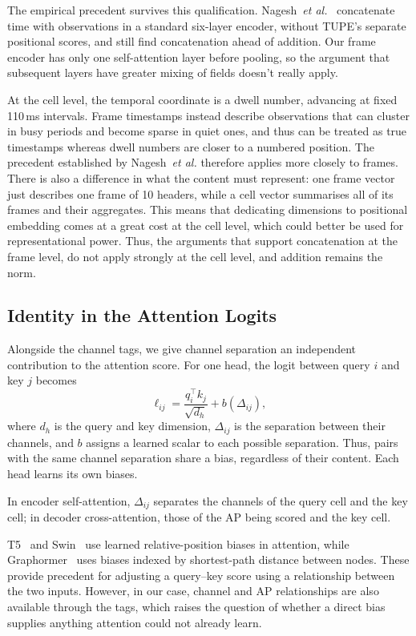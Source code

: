 \documentclass[conference]{IEEEtran}
\begin{document}
The empirical precedent survives this qualification. Nagesh~\emph{et al.}~\cite{nagesh2021ema}
concatenate time with observations in a standard six-layer encoder, without
TUPE's separate positional scores, and still find concatenation ahead of
addition. Our frame encoder has only one self-attention layer before pooling,
so the argument that subsequent layers have greater mixing of fields doesn't really apply.

At the cell level, the temporal coordinate is a dwell number, advancing at
fixed 110\,ms intervals. Frame timestamps instead describe observations that
can cluster in busy periods and become sparse in quiet ones, and thus can be 
treated as true timestamps whereas dwell numbers are closer to a numbered position. 
The precedent established by Nagesh~\emph{et al.} therefore applies more closely to frames. 
There is also a difference in what the content must represent: 
one frame vector just describes one frame of 10 headers, while
a cell vector summarises all of its frames and their aggregates. This means that dedicating
dimensions to positional embedding comes at a great cost at the cell level, which could better be used
for representational power. Thus, the arguments that support concatenation at the frame level, do not
apply strongly at the cell level, and addition remains the norm.

\subsection{Identity in the Attention Logits}

Alongside the channel tags, we give channel separation an independent
contribution to the attention score. For one head, the logit between query
$i$ and key $j$ becomes
\begin{equation}
 \ell_{ij} = \frac{q_i^\top k_j}{\sqrt{d_h}} + b(\Delta_{ij}),
\end{equation}
where $d_h$ is the query and key dimension, $\Delta_{ij}$ is the separation
between their channels, and $b$ assigns a learned scalar to each possible
separation. Thus, pairs with the same channel separation share a bias,
regardless of their content. Each head learns its own biases.

In encoder self-attention, $\Delta_{ij}$ separates the channels of the query
cell and the key cell; in decoder cross-attention, those of the AP being
scored and the key cell.

T5~\cite{raffel2020t5} and Swin~\cite{liu2021swin} use learned relative-position
biases in attention, while Graphormer~\cite{ying2021graphormer} uses biases
indexed by shortest-path distance between nodes. These provide precedent for
adjusting a query--key score using a relationship between the two inputs.
However, in our case, channel and AP relationships are also available through the tags, 
which raises the question of whether a direct bias supplies anything attention
could not already learn.
\end{document}
